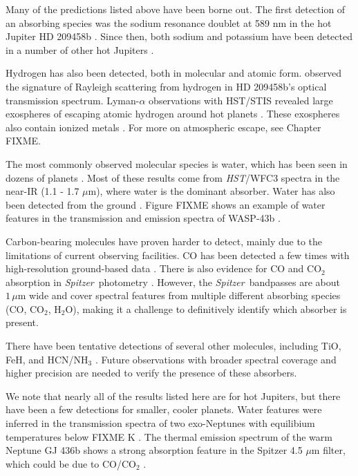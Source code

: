 \documentclass[graybox,natbib,nosecnum]{svmult}
\newcommand{\project}[1]{\textsl{#1}}
\newcommand{\HST}{\project{HST}}
\newcommand{\Spitzer}{\project{Spitzer}}
\begin{document}
Many of the predictions listed above have been borne out.  The first detection of an absorbing species was the sodium resonance doublet at 589 nm in the hot Jupiter HD 209458b \citep{charbonneau02}. Since then, both sodium and potassium have been detected in a number of other hot Jupiters \citep[e.g.][]{sing11b, jensen11, nikolov14, fischer16}.

Hydrogen has also been detected, both in molecular and atomic form. \cite{lecavelier08} observed the signature of Rayleigh scattering from hydrogen in HD 209458b's optical transmission spectrum.  Lyman-$\alpha$ observations with HST/STIS revealed  large exospheres of escaping atomic hydrogen around hot planets \citep[e.g.][]{vidal-madjar03, ehrenreich15}.  These exospheres also contain ionized metals \citep[e.g., OI, CII][]{vidal-madjar04}. For more on atmospheric escape, see Chapter FIXME.

The most commonly observed molecular species is water, which has been seen in dozens of planets \citep[e.g.][]{deming13, huitson13, mccullough14, fraine14, kreidberg14b, kreidberg15b, line16, evans16}. Most of these results come from \HST/WFC3 spectra in the near-IR (1.1 - 1.7 $\mu$m), where water is the dominant absorber. Water has also been detected from the ground \citep{birkby13, stevenson16b}.  Figure FIXME shows an example of water features in the transmission and emission spectra of WASP-43b \citep{kreidberg14b}. 

Carbon-bearing molecules have proven harder to detect, mainly due to the limitations of current observing facilities. CO has been detected a few times with high-resolution ground-based data \citep{dekok13,brogi14}.  There is also evidence for CO and CO$_2$ absorption in \Spitzer\ photometry \citep[e.g.][]{desert09}. However, the \Spitzer\ bandpasses are about $1\,\mu$m wide and cover spectral features from multiple different absorbing species (CO, CO$_2$, H$_2$O), making it a challenge to definitively identify which absorber is present. 

There have been tentative detections of several other molecules, including TiO, FeH, and HCN/NH$_3$ \citep[e.g.,][]{tsiaras16, evans16, macdonald17}. Future observations with broader spectral coverage and higher precision are needed to verify the presence of these absorbers.

We note that nearly all of the results listed here are for hot Jupiters, but there have been a few detections for smaller, cooler planets. Water features were inferred in the transmission spectra of two exo-Neptunes with equilibium temperatures below FIXME K \citep{fraine14, wakeford17}. The thermal emission spectrum of the warm Neptune GJ 436b shows a strong absorption feature in the Spitzer 4.5 $\mu$m filter, which could be due to CO/CO$_2$ \citep{morley17}. 
\end{document}
